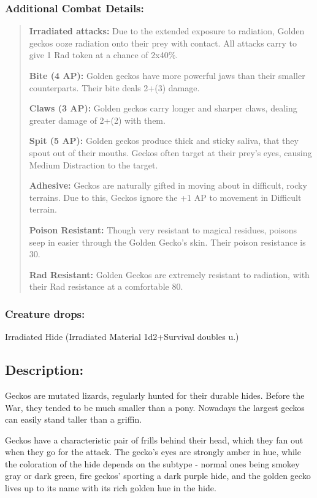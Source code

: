 \documentclass[11pt,a4paper,twocolumn]{book}
\begin{document}
	\subsubsection*{Additional Combat Details:}
	\begin{verse}
		\textbf{Irradiated attacks:} Due to the extended exposure to radiation, Golden geckos ooze radiation onto their prey with contact. All attacks carry to give 1 Rad token at a chance of 2x40\%.
		
		\textbf{Bite (4 AP):} Golden geckos have more powerful jaws than their smaller counterparts. Their bite deals 2+(3) damage. 
		
		\textbf{Claws (3 AP):} Golden geckos carry longer and sharper claws, dealing greater damage of 2+(2) with them.
		
		\textbf{Spit (5 AP):}  Golden geckos produce thick and sticky saliva, that they spout out of their mouths. Geckos often target at their prey's eyes, causing Medium Distraction to the target.
		
		\textbf{Adhesive:} Geckos are naturally gifted in moving about in difficult, rocky terrains. Due to this, Geckos ignore the +1 AP to movement in Difficult terrain.
		
		\textbf{Poison Resistant:} Though very resistant to magical residues, poisons seep in easier through the Golden Gecko's skin. Their poison resistance is 30.
		
		\textbf{Rad Resistant:} Golden Geckos are extremely resistant to radiation, with their Rad resistance at a comfortable 80.
	\end{verse}
	
	\subsubsection*{Creature drops:}
	Irradiated Hide (Irradiated Material 1d2+Survival doubles u.)
	
	
	
	
	
	\subsection*{Description:}
	Geckos are mutated lizards, regularly hunted for their durable hides. Before the War, they tended to be much smaller than a pony. Nowadays the largest geckos can easily stand taller than a griffin.
	
	Geckos have a characteristic pair of frills behind their head, which they fan out when they go for the attack. The gecko's eyes are strongly amber in hue, while the coloration of the hide depends on the subtype - normal ones being smokey gray or dark green, fire geckos' sporting a dark purple hide, and the golden gecko lives up to its name with its rich golden hue in the hide. 
	
\end{document}
